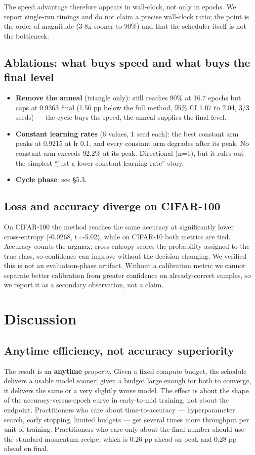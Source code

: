 \documentclass[11pt,a4paper]{article}
\begin{document}
The speed advantage therefore appears in wall-clock, not only in epochs. We report single-run timings and do not claim a precise wall-clock ratio; the point is the order of magnitude (3-8x sooner to 90\%) and that the scheduler itself is not the bottleneck.

\subsection{Ablations: what buys speed and what buys the final level}
\begin{itemize}
\item \textbf{Remove the anneal} (triangle only): still reaches 90\% at 16.7 epochs but caps at 0.9363 final (1.56 pp below the full method, 95\% CI 1.07 to 2.04, 3/3 seeds) --- the cycle buys the speed, the anneal supplies the final level.
\item \textbf{Constant learning rates} (6 values, 1 seed each): the best constant arm peaks at 0.9215 at lr 0.1, and every constant arm degrades after its peak. No constant arm exceeds 92.2\% at its peak. Directional (n=1), but it rules out the simplest ``just a lower constant learning rate'' story.
\item \textbf{Cycle phase}: see \S{}5.3.
\end{itemize}

\subsection{Loss and accuracy diverge on CIFAR-100}
On CIFAR-100 the method reaches the same accuracy at significantly lower cross-entropy (-0.0268, t=-5.02), while on CIFAR-10 both metrics are tied. Accuracy counts the argmax; cross-entropy scores the probability assigned to the true class, so confidence can improve without the decision changing. We verified this is not an evaluation-phase artifact. Without a calibration metric we cannot separate better calibration from greater confidence on already-correct samples, so we report it as a secondary observation, not a claim.

\section{Discussion}
\subsection{Anytime efficiency, not accuracy superiority}
The result is an \textbf{anytime} property. Given a fixed compute budget, the schedule delivers a usable model sooner; given a budget large enough for both to converge, it delivers the same or a very slightly worse model. The effect is about the shape of the accuracy-versus-epoch curve in early-to-mid training, not about the endpoint. Practitioners who care about time-to-accuracy --- hyperparameter search, early stopping, limited budgets --- get several times more throughput per unit of training. Practitioners who care only about the final number should use the standard momentum recipe, which is 0.26 pp ahead on peak and 0.28 pp ahead on final.
\end{document}
